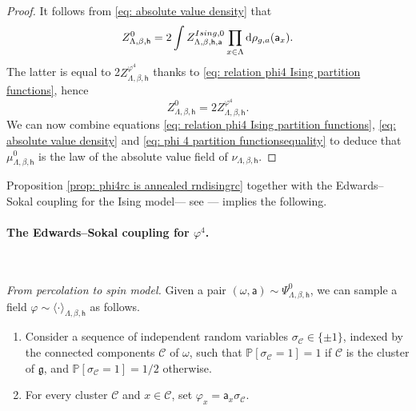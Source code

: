 \documentclass[11pt,a4paper]{article}
\theoremstyle{definition}
\numberwithin{equation}{section}
\newcommand\fg{\mathfrak{g}}
\begin{document}
\begin{proof}
It follows from \eqref{eq: absolute value density} that
\begin{equation}
Z^0_{\Lambda,\beta,\mathsf{h}}=2\int Z^{\rm Ising,0}_{\Lambda,\beta, \mathsf{h},\mathsf{a}}
\prod_{x\in \Lambda}\mathrm{d} \rho_{g,a}(\mathsf{a}_x).  
\end{equation}
The latter is equal to 2$Z^{\varphi^4}_{\Lambda,\beta,\mathsf{h}}$ thanks to \eqref{eq: relation phi4 Ising partition functions}, hence 
\begin{equation}\label{eq: phi 4 partition functionsequality} Z^0_{\Lambda,\beta,\mathsf{h}}=2Z^{\varphi^4}_{\Lambda,\beta,\mathsf{h}}.
\end{equation}
We can now combine equations \eqref{eq: relation phi4 Ising partition functions}, \eqref{eq: absolute value density} and \eqref{eq: phi 4 partition functionsequality} to deduce that $\mu^{0}_{\Lambda,\beta,\mathsf h}$ is the law of the absolute value field of $\nu_{\Lambda,\beta,\mathsf h}$.
\end{proof}


Proposition \ref{prop: phi4rc is annealed rndisingrc} together with the Edwards--Sokal coupling for the Ising model--- see \cite[Chapter 1]{Grimmett2006RCM}--- implies the following. 


\paragraph{The Edwards--Sokal coupling for $\varphi^4$.}
\
\vspace{1mm}
\

\noindent\textit{From percolation to spin model.} 
Given a pair $(\omega,\mathsf{a})\sim \Psi^0_{\Lambda,\beta,\mathsf{h}}$, we can sample a field $\varphi\sim \langle \cdot \rangle_{\Lambda,\beta,\mathsf{h}}$ as follows.
\begin{enumerate}
\item[(i)] Consider a sequence of independent random variables $\sigma_{\mathcal{C}}\in \{\pm 1\}$, indexed by the connected components $\mathcal{C}$ of $\omega$, such that $\mathbb{P}[\sigma_{\mathcal{C}}=1]=1$ if $\mathcal{C}$ is the cluster of $\fg$, and $\mathbb{P}[\sigma_{\mathcal{C}}=1]=1/2$ otherwise.
\item[(ii)] For every cluster $\mathcal{C}$ and $x\in \mathcal{C}$, set $\varphi_x = \mathsf{a}_x \sigma_{\mathcal{C}}$.
\end{enumerate}
\end{document}
